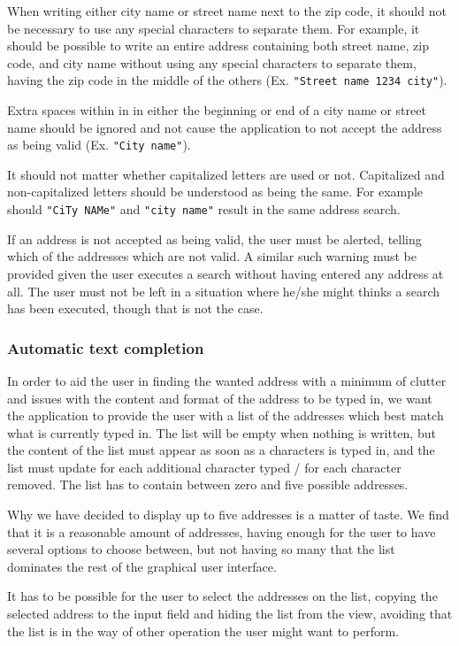 When writing either city name or street name next to the zip code, it should not be necessary to use any special characters to separate them. For example, it should be possible to write an entire address containing both street name, zip code, and city name without using any special characters to separate them, having the zip code in the middle of the others (Ex. \texttt{"Street name 1234 city"}).

Extra spaces within in in either the beginning or end of a city name or street name should be ignored and not cause the application to not accept the address as being valid (Ex. \texttt{"City    name"}).

It should not matter whether capitalized letters are used or not. Capitalized and non-capitalized letters should be understood as being the same. For example should \texttt{"CiTy NAMe"} and \texttt{"city name"} result in the same address search.

If an address is not accepted as being valid, the user must be alerted, telling which of the addresses which are not valid. A similar such warning must be provided given the user executes a search without having entered any address at all. The user must not be left in a situation where he/she might thinks a search has been executed, though that is not the case.

\subsubsection{Automatic text completion}
In order to aid the user in finding the wanted address with a minimum of clutter and issues with the content and format of the address to be typed in, we want the application to provide the user with a list of the addresses which best match what is currently typed in. The list will be empty when nothing is written, but the content of the list must appear as soon as a characters is typed in, and the list must update for each additional character typed / for each character removed. The list has to contain between zero and five possible addresses.

Why we have decided to display up to five addresses is a matter of taste. We find that it is a reasonable amount of addresses, having enough for the user to have several options to choose between, but not having so many that the list dominates the rest of the graphical user interface.

It has to be possible for the user to select the addresses on the list, copying the selected address to the input field and hiding the list from the view, avoiding that the list is in the way of other operation the user might want to perform.